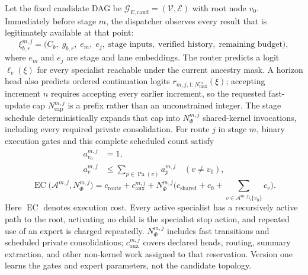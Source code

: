 \documentclass[10pt,a4paper]{article}
\newcommand{\op}[1]{\operatorname{#1}}
\newcommand{\EC}{\operatorname{EC}}
\newcommand{\gcand}{\mathcal{G}_{E,\mathrm{cand}}}
\newcommand{\Acal}{\mathcal{A}}
\newcommand{\Vcal}{\mathcal{V}}
\newcommand{\Ecal}{\mathcal{E}}
\begin{document}
Let the fixed candidate DAG be $\gcand = (\Vcal, \Ecal)$ with root node $v_0$.
Immediately before stage $m$, the dispatcher observes every result that is
legitimately available at that point:
\begin{equation*}
\xi^{m,j}_{b,r} = \bigl(C_b,\; g_{b,r},\; e_m,\; e_j,\; \text{stage inputs},\;
\text{verified history},\; \text{remaining budget}\bigr),
\end{equation*}
where $e_m$ and $e_j$ are stage and lane embeddings. The router predicts a
logit $\ell_v(\xi)$ for every specialist reachable under the current ancestry
mask. A horizon head also predicts ordered continuation logits
$r_{m,j,1:N^m_{\max}}(\xi)$; accepting increment $n$ requires accepting every
earlier increment, so the requested fast-update cap $N^{m,j}_{\mathrm{cap}}$ is
a prefix rather than an unconstrained integer. The stage schedule
deterministically expands that cap into $N^{m,j}_\Phi$ shared-kernel
invocations, including every required private consolidation. For route $j$ in
stage $m$, binary execution gates and this complete scheduled count satisfy
\begin{align}
a^{m,j}_{v_0} &= 1, \\
a^{m,j}_{v} &\le \sum_{p \in \op{Pa}(v)} a^{m,j}_{p} \quad (v \ne v_0),
\end{align}
\begin{equation}
\EC\bigl(\Acal^{m,j}, N^{m,j}_\Phi\bigr) = c_{\mathrm{route}}
+ c^{m,j}_{\mathrm{aux}}
+ N^{m,j}_\Phi \Biggl( c_{\mathrm{shared}} + c_0
+ \sum_{v \in \Acal^{m,j} \setminus \{v_0\}} c_v \Biggr).
\end{equation}
Here $\EC$ denotes execution cost. Every active specialist has a recursively
active path to the root, activating no child is the specialist stop action, and
repeated use of an expert is charged repeatedly. $N^{m,j}_\Phi$ includes fast
transitions and scheduled private consolidations; $c^{m,j}_{\mathrm{aux}}$
covers declared heads, routing, summary extraction, and other non-kernel work
assigned to that reservation. Version one learns the gates and expert
parameters, not the candidate topology.
\end{document}
